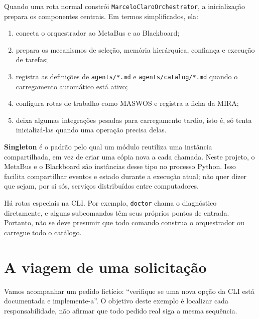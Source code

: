 \begin{processo}
Quando uma rota normal constrói \texttt{MarceloClaroOrchestrator}, a inicialização
prepara os componentes centrais. Em termos simplificados, ela:
\begin{enumerate}[leftmargin=1.4em,itemsep=1pt]
  \item conecta o orquestrador ao MetaBus e ao Blackboard;
  \item prepara os mecanismos de seleção, memória hierárquica, confiança e
        execução de tarefas;
  \item registra as definições de \texttt{agents/*.md} e
        \texttt{agents/catalog/*.md} quando o carregamento automático está ativo;
  \item configura rotas de trabalho como MASWOS e registra a ficha da MIRA;
  \item deixa algumas integrações pesadas para carregamento tardio, isto é,
        só tenta inicializá-las quando uma operação precisa delas.
\end{enumerate}
\end{processo}

\begin{descricao}
\textbf{Singleton} é o padrão pelo qual um módulo reutiliza uma instância
compartilhada, em vez de criar uma cópia nova a cada chamada. Neste projeto, o
MetaBus e o Blackboard são instâncias desse tipo no processo Python. Isso
facilita compartilhar eventos e estado durante a execução atual; não quer dizer
que sejam, por si sós, serviços distribuídos entre computadores.
\end{descricao}

\begin{aviso}
Há rotas especiais na CLI. Por exemplo, \texttt{doctor} chama o diagnóstico
diretamente, e alguns subcomandos têm seus próprios pontos de entrada. Portanto,
não se deve presumir que todo comando construa o orquestrador ou carregue todo o
catálogo.
\end{aviso}

\section{A viagem de uma solicitação}

\begin{descricao}
Vamos acompanhar um pedido fictício: ``verifique se uma nova opção da CLI está
documentada e implemente-a''. O objetivo deste exemplo é localizar cada
responsabilidade, não afirmar que todo pedido real siga a mesma sequência.
\end{descricao}

